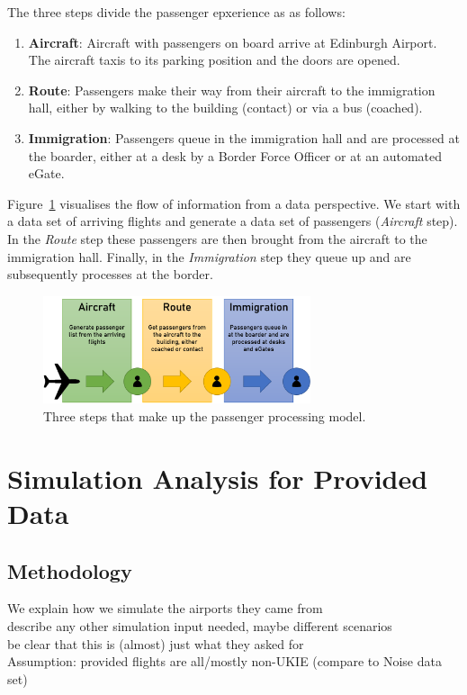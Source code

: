 \documentclass[10pt]{article}
\begin{document}
The three steps divide the passenger epxerience as as follows:
\begin{enumerate}
    \item \textbf{Aircraft}: Aircraft with passengers on board arrive at Edinburgh Airport. The aircraft taxis to its parking position and the doors are opened. \label{step:aircraft}
    \item \textbf{Route}: Passengers make their way from their aircraft to the immigration hall, either by walking to the building (contact) or via a bus (coached). \label{step:route}
    \item \textbf{Immigration}: Passengers queue in the immigration hall and are processed at the boarder, either at a desk by a Border Force Officer or at an automated eGate. \label{step:immigration}
\end{enumerate}

 Figure~\ref{PPM_threesteps} visualises the flow of information from a data perspective. We start with a data set of arriving flights and generate a data set of passengers (\textit{Aircraft} step). In the \textit{Route} step these passengers are then brought from the aircraft to the immigration hall. Finally, in the \textit{Immigration} step they queue up and are subsequently processes at the border.

\begin{figure}[!ht]
    \centering
    \includegraphics[width=0.7\textwidth]{figures/ThreeSteps.png}
     \caption{Three steps that make up the passenger processing model. } \label{PPM_threesteps}
\end{figure}


\section{Simulation Analysis for Provided Data}

\subsection{Methodology}
We explain how we simulate the airports they came from \\
describe any other simulation input needed, maybe different scenarios \\ 
be clear that this is (almost) just what they asked for  \\ Assumption: provided flights are all/mostly non-UKIE (compare to Noise data set)
\end{document}
